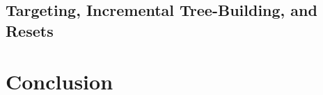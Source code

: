 \documentclass[letterpaper]{article}
\newcommand{\tth}{\mathtt{h}}
\begin{document}
\subsection{Targeting, Incremental Tree-Building, and Resets}





\section{Conclusion}





\end{document}
